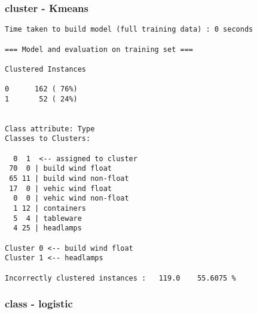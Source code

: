 \documentclass[a4paper]{article}
\begin{document}
\subsubsection{cluster - Kmeans}

\begin{verbatim}
Time taken to build model (full training data) : 0 seconds

=== Model and evaluation on training set ===

Clustered Instances

0      162 ( 76%)
1       52 ( 24%)


Class attribute: Type
Classes to Clusters:

  0  1  <-- assigned to cluster
 70  0 | build wind float
 65 11 | build wind non-float
 17  0 | vehic wind float
  0  0 | vehic wind non-float
  1 12 | containers
  5  4 | tableware
  4 25 | headlamps

Cluster 0 <-- build wind float
Cluster 1 <-- headlamps

Incorrectly clustered instances :	119.0	 55.6075 %

\end{verbatim}


\subsubsection{class - logistic}
\end{document}
